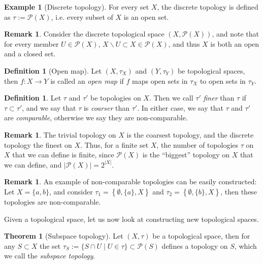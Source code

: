 \documentclass[12pt, a4paper]{article}
\numberwithin{equation}{section}
\theoremstyle{definition}
\theoremstyle{definition}
\newtheorem{defn}[thm]{Definition} %
\newtheorem{exmp}[thm]{Example} %
\newtheorem{remark}[thm]{Remark} %
\newtheorem{theorem}[thm]{Theorem}
\newcommand{\abs}[1]{\left\vert #1 \right\vert}
\begin{document}
		\begin{exmp}[Discrete topology]\label{exmp:discrete_topology}
			For every set $X$, the discrete topology is defined as $\tau := \mathcal P(X)$, i.e. every subset of $X$ is an open set.
		\end{exmp}
	
		\begin{remark}
			Consider the discrete topological space $(X, \mathscr P(X))$, and note that for every member $U\in \mathscr P(X)$, $X\backslash U\subset X\in \mathscr P(X)$, and thus $X$ is both an open and a closed set. 
		\end{remark}

		\begin{defn}[Open map]\label{defn:open_map}
			Let $(X, \tau_X)$ and $(Y, \tau_Y)$ be topological spaces, then $f: X \to Y$ is called an \textit{open map} if $f$ maps open sets in $\tau_X$ to open sets in $\tau_Y$.
		\end{defn}
	
		\begin{defn}\label{defn:comparison_of_topologies}
			Let $\tau$ and $\tau'$ be topologies on $X$. Then we call $\tau'$ \textit{finer} than $\tau$ if $\tau\subset\tau'$, and we say that $\tau$ is \textit{coarser} than $\tau'$. In either case, we say that $\tau$ and $\tau'$ are \textit{comparable}, otherwise we say they are non-comparable.
		\end{defn}
		
		\begin{remark}
			The trivial topology on $X$ is the coarsest topology, and the discrete topology the finest on $X$. Thus, for a finite set $X$, the number of topologies $\tau$ on $X$ that we can define is finite, since $\mathscr P(X)$ is the \enquote{biggest} topology on $X$ that we can define, and $\abs{\mathscr P(X)} = 2^{\abs{X}}$.
		\end{remark}
		
		\begin{remark}
			An example of non-comparable topologies can be easily constructed: Let $X = \{a, b\}$, and consider $\tau_1 = \left\{\emptyset, \{a\}, X\right\}$ and $\tau_2 = \left\{\emptyset, \{b\}, X\right\}$, then these topologies are non-comparable.
		\end{remark}
	
		Given a topological space, let us now look at constructing new topological spaces.
	
		\begin{theorem}[Subspace topology]\label{thrm:subspace_topology}
			Let $(X, \tau)$ be a topological space, then for any $S\subset X$ the set
			$\tau_S := \{S \cap U \mid U\in \tau\}\subset \mathcal P(S)$ defines a topology on $S$, which we call the \textit{subspace topology}.
		\end{theorem}
	
\end{document}
